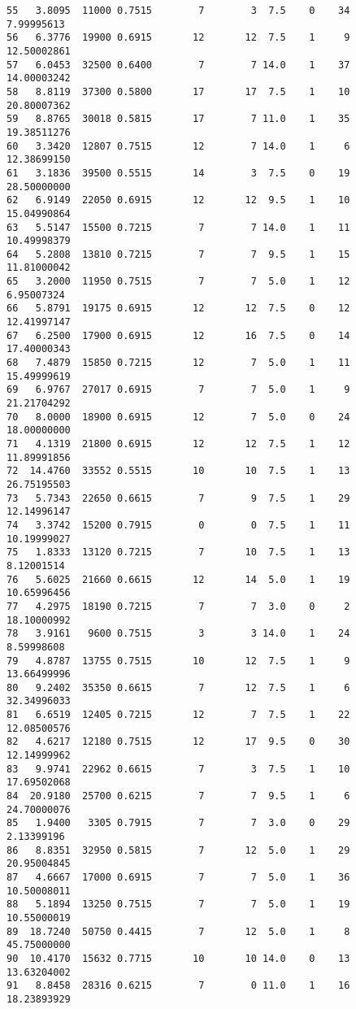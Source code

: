 \documentclass[
  letterpaper,
  DIV=11,
  numbers=noendperiod]{scrreprt}
\begin{document}
\begin{verbatim}
55   3.8095  11000 0.7515        7        3  7.5    0    34  7.99995613
56   6.3776  19900 0.6915       12       12  7.5    1     9 12.50002861
57   6.0453  32500 0.6400        7        7 14.0    1    37 14.00003242
58   8.8119  37300 0.5800       17       17  7.5    1    10 20.80007362
59   8.8765  30018 0.5815       17        7 11.0    1    35 19.38511276
60   3.3420  12807 0.7515       12        7 14.0    1     6 12.38699150
61   3.1836  39500 0.5515       14        3  7.5    0    19 28.50000000
62   6.9149  22050 0.6915       12       12  9.5    1    10 15.04990864
63   5.5147  15500 0.7215        7        7 14.0    1    11 10.49998379
64   5.2808  13810 0.7215        7        7  9.5    1    15 11.81000042
65   3.2000  11950 0.7515        7        7  5.0    1    12  6.95007324
66   5.8791  19175 0.6915       12       12  7.5    0    12 12.41997147
67   6.2500  17900 0.6915       12       16  7.5    0    14 17.40000343
68   7.4879  15850 0.7215       12        7  5.0    1    11 15.49999619
69   6.9767  27017 0.6915        7        7  5.0    1     9 21.21704292
70   8.0000  18900 0.6915       12        7  5.0    0    24 18.00000000
71   4.1319  21800 0.6915       12       12  7.5    1    12 11.89991856
72  14.4760  33552 0.5515       10       10  7.5    1    13 26.75195503
73   5.7343  22650 0.6615        7        9  7.5    1    29 12.14996147
74   3.3742  15200 0.7915        0        0  7.5    1    11 10.19999027
75   1.8333  13120 0.7215        7       10  7.5    1    13  8.12001514
76   5.6025  21660 0.6615       12       14  5.0    1    19 10.65996456
77   4.2975  18190 0.7215        7        7  3.0    0     2 18.10000992
78   3.9161   9600 0.7515        3        3 14.0    1    24  8.59998608
79   4.8787  13755 0.7515       10       12  7.5    1     9 13.66499996
80   9.2402  35350 0.6615        7       12  7.5    1     6 32.34996033
81   6.6519  12405 0.7215       12        7  7.5    1    22 12.08500576
82   4.6217  12180 0.7515       12       17  9.5    0    30 12.14999962
83   9.9741  22962 0.6615        7        3  7.5    1    10 17.69502068
84  20.9180  25700 0.6215        7        7  9.5    1     6 24.70000076
85   1.9400   3305 0.7915        7        7  3.0    0    29  2.13399196
86   8.8351  32950 0.5815        7       12  5.0    1    29 20.95004845
87   4.6667  17000 0.6915        7        7  5.0    1    36 10.50008011
88   5.1894  13250 0.7515        7        7  5.0    1    19 10.55000019
89  18.7240  50750 0.4415        7       12  5.0    1     8 45.75000000
90  10.4170  15632 0.7715       10       10 14.0    0    13 13.63204002
91   8.8458  28316 0.6215        7        0 11.0    1    16 18.23893929

\end{verbatim}
\end{document}
